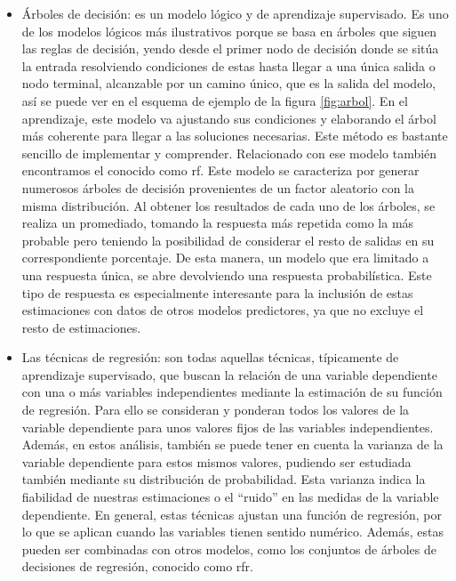 \begin{itemize}
	\item Árboles de decisión: es un modelo lógico y de aprendizaje supervisado. Es uno de los modelos lógicos más ilustrativos porque se basa en árboles que siguen las reglas de decisión, yendo desde el primer nodo de decisión donde se sitúa la entrada resolviendo condiciones de estas hasta llegar a una única salida o nodo terminal, alcanzable por un camino único, que es la salida del modelo, así se puede ver en el esquema de ejemplo de la figura \ref{fig:arbol}. En el aprendizaje, este modelo va ajustando sus condiciones y elaborando el árbol más coherente para llegar a las soluciones necesarias. Este método es bastante sencillo de implementar y comprender. Relacionado con ese modelo también encontramos el conocido como \gls{rf}. Este modelo se caracteriza por generar numerosos árboles de decisión provenientes de un factor aleatorio con la misma distribución. Al obtener los resultados de cada uno de los árboles, se realiza un promediado, tomando la respuesta más repetida como la más probable pero teniendo la posibilidad de considerar el resto de salidas en su correspondiente porcentaje. De esta manera, un modelo que era limitado a una respuesta única, se abre devolviendo una respuesta probabilística. Este tipo de respuesta es especialmente interesante para la inclusión de estas estimaciones con datos de otros modelos predictores, ya que no excluye el resto de estimaciones. 
	\item Las técnicas de regresión: son todas aquellas técnicas, típicamente de aprendizaje supervisado, que buscan la relación de una variable dependiente con una o más variables independientes mediante la estimación de su función de regresión. Para ello se consideran y ponderan todos los valores de la variable dependiente para unos valores fijos de las variables independientes. Además, en estos análisis, también se puede tener en cuenta la varianza de la variable dependiente para estos mismos valores, pudiendo ser estudiada también mediante su distribución de probabilidad. Esta varianza indica la fiabilidad de nuestras estimaciones o el ``ruido'' en las medidas de la variable dependiente. En general, estas técnicas ajustan una función de regresión, por lo que se aplican cuando las variables tienen sentido numérico. Además, estas pueden ser combinadas con otros modelos, como los conjuntos de árboles de decisiones de regresión, conocido como \gls{rfr}.
\end{itemize}

